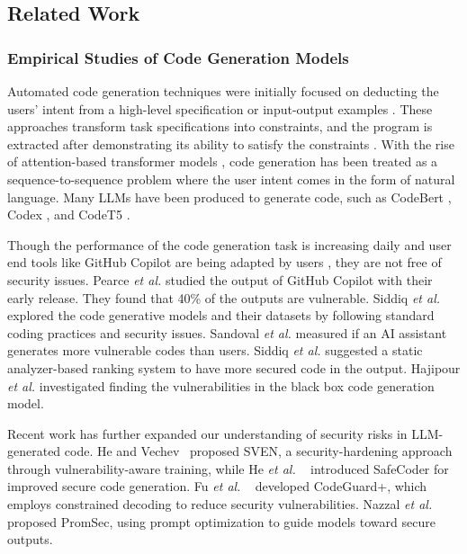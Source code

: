 \documentclass[pdflatex,sn-mathphys-ay]{sn-jnl}
\newcommand{\etal}{\textit{et al.} }
\begin{document}
\subsection{Related Work}\label{sec:relatedWork}



\subsubsection{Empirical Studies of Code Generation Models}

Automated code generation techniques were initially focused on deducting the users' intent from a high-level specification or input-output examples \cite{gulwani2017program,green69, manna2017}. These approaches transform task specifications into constraints, and the program is extracted after demonstrating its ability to satisfy the constraints \cite{gulwani2017program}.
With the rise of attention-based transformer models \cite{attention2017}, code generation has been treated as a sequence-to-sequence problem where the user intent comes in the form of natural language. Many LLMs have been produced to generate code, such as CodeBert \cite{codebert}, Codex \cite{chen2021codex}, and CodeT5 \cite{codet5}. 

Though the performance of the code generation task is increasing daily and user end tools like GitHub Copilot are being adapted by users \cite{shani2023survey}, they are not free of security issues. Pearce \etal \cite{pearce2021} studied the output of GitHub Copilot with their early release. They found that 40\% of the outputs are vulnerable. Siddiq \etal \cite{siddiq2022empirical} explored the code generative models and their datasets by following standard coding practices and security issues. Sandoval \etal \cite{sandoval2022security} measured if an AI assistant generates more vulnerable codes than users. Siddiq \etal \cite{siddiq2023franc} suggested a static analyzer-based ranking system to have more secured code in the output. Hajipour \etal \cite{hajipour2023systematically} investigated finding the vulnerabilities in the black box code generation model.

Recent work has further expanded our understanding of security risks in LLM-generated code. He and Vechev~\cite{he2023sven} proposed SVEN, a security-hardening approach through vulnerability-aware training, while He \etal~\cite{he2024safecoder} introduced SafeCoder for improved secure code generation. Fu \etal~\cite{fu2024codeguard} developed CodeGuard+, which employs constrained decoding to reduce security vulnerabilities. Nazzal \etal~\cite{nazzal2024promsec} proposed PromSec, using prompt optimization to guide models toward secure outputs.
\end{document}
